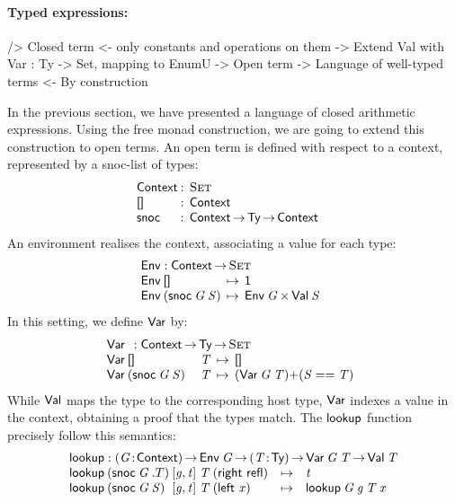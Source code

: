 \paragraph{Typed expressions:}

\begin{wstructure}
    /> Closed term
        <- only constants and operations on them
        -> Extend Val with Var : Ty -> Set, mapping to EnumU
            -> Open term
            -> Language of well-typed terms
                <- By construction
\end{wstructure}

\newcommand{\Ctxt}{\D{Context}}
\newcommand{\SYMBCtxtEmpty}{\C{[]}\xspace}
\newcommand{\CtxtEmpty}{\SYMBCtxtEmpty}
\newcommand{\SYMBCtxtSnoc}{\C{snoc}\xspace}
\newcommand{\CtxtSnoc}[2]{\SYMBCtxtSnoc\:#1\:#2}
\newcommand{\SYMBEnv}{\F{Env}}
\newcommand{\Env}[1]{\SYMBEnv\: #1}
\newcommand{\SYMBlookup}{\F{lookup}}
\newcommand{\lookup}[4]{\SYMBlookup\: #1\: #2\: #3\: #4}

In the previous section, we have presented a language of closed
arithmetic expressions. Using the free monad construction, we are
going to extend this construction to open terms. An open term is
defined with respect to a context, represented by a snoc-list of
types:
%
\[
\begin{array}{@{}l@{\::\:\:}l@{\quad}l}
\Ctxt           & \Set \\
\SYMBCtxtEmpty  & \Ctxt \\
\SYMBCtxtSnoc   & \Ctxt \To \Ty \To \Ctxt
\end{array}
\]
%
An environment realises the context, associating a value for each type:
%
\[
\stk{
\SYMBEnv : \Ctxt \To \Set \\
\begin{array}{@{}l@{\:\:\mapsto\:\:}l}
\Env{\CtxtEmpty}                & \Unit \\
\Env{(\CtxtSnoc{\V{G}}{\V{S}})} & \TIMES{\Env{\V{G}}}{\Val{\V{S}}}
\end{array}
}\]
%
In this setting, we define $\SYMBVar$ by:
%
\[\stk{
\Var{}{} : \Ctxt \To \Ty \To \Set \\
\begin{array}{@{}ll@{\:\:\mapsto\:\:}l}
\Var{\CtxtEmpty}{& \V{T}}                & 
    \Void \\
\Var{(\CtxtSnoc{\V{G}}{\V{S}})}{& \V{T}} & 
    \SUM{(\Var{\V{G}}{\V{T}})}{(\V{S} \PropEq \V{T})}
\end{array}
}\]
%
While $\SYMBVal$ maps the type to the corresponding host type,
$\SYMBVar$ indexes a value in the context, obtaining a proof that the
types match. The $\SYMBlookup$ function precisely follow this
semantics:
%
\[\stk{
\SYMBlookup : \PI{\V{G}}{\Ctxt} 
          \Env{\V{G}} \To 
          \PI{\V{T}}{\Ty} 
          \Var{\V{G}}{\V{T}} \To
          \Val{\V{T}} \\
\begin{array}{@{}l@{}l@{}l@{}l@{}lll}
\lookup{& (\CtxtSnoc{\V{G}}{.T})}{& \pair{\V{g}}{\V{t}}{}}{& \V{T}}{& (\SumRight{\C{refl}})} & \mapsto & \V{t} \\
\lookup{& (\CtxtSnoc{\V{G}}{\V{S}})}{& \pair{\V{g}}{\V{t}}{}}{& \V{T}}{& (\SumLeft{\V{x}})} & \mapsto & \lookup{\V{G}}{\V{g}}{\V{T}}{\V{x}} 
\end{array}
}\]

